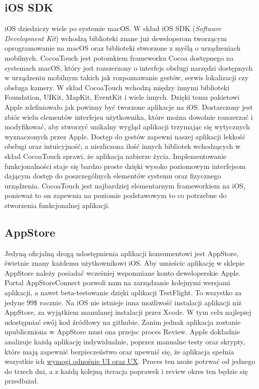 \documentclass{article}
\begin{document}
\subsection*{iOS SDK}
iOS dziedziczy wiele po systemie macOS\@. W skład iOS SDK (\textit{Software Development 
Kit}) wchodzą biblioteki znane już deweloperom tworzącym oprogramowanie na macOS
oraz biblioteki stworzone z myślą o urządzeniach mobilnych. CocoaTouch jest potomkiem 
frameworku Cocoa dostępnego na systemach macOS, który jest rozszerzony o interfejs 
obsługi narzędzi dostępnych w urządzeniu mobilnym takich jak rozpoznawanie gestów,
serwis lokalizacji czy obsługa kamery. W skład CocoaTouch wchodzą między innymi
biblioteki Foundation, UIKit, MapKit, EventKit i wiele innych. Dzięki temu pakietowi
Apple zdefiniowało jak powinny być tworzone aplikacje na iOS\@. Dostarczony jest 
zbiór wielu elementów interfejsu użytkownika, które można dowolnie rozszerzać i
modyfikować, aby stworzyć unikalny wygląd aplikacji trzymając się wytycznych
wyznaczonych przez Apple. Dostęp do gestów zapewni naszej aplikacji lekkość obsługi
oraz intuicyjność, a niezliczona ilość innych bibliotek wchodzących w skład
CocoaTouch sprawi, że aplikacja nabierze życia. Implementowanie funkcjonalności staje
się bardzo proste dzięki wysoko poziomowym interfejsom dającym dostęp do
poszczególnych elementów systemu oraz fizycznego urządzenia. CocoaTouch jest 
najbardziej elementarnym frameworkiem na iOS, ponieważ to on zapewnia na poziomie
podstawowym to co potrzebne do stworzenia funkcjonalnej aplikacji. 

\subsection*{AppStore}
Jedyną oficjalną drogą udostępnienia aplikacji konsumentowi jest AppStore, świetnie
znany każdemu użytkownikowi iOS\@. Aby umieścic aplikację w sklepie AppStore
należy posiadać wcześniej wspomniane konto deweloperskie Apple. Portal AppStoreConnect
pozwoli nam na zarządzanie kolejnymi wersjami aplikacji, a nawet beta-testowanie
dzięki aplikacji TestFlight. To wszystko za jedyne 99\$ rocznie. Na iOS nie istnieje
inna możliwość instalacji aplikacji niż AppStore, za wyjątkiem manulanej instalacji
przez Xcode. W tym celu najlepiej udostępniać swój kod źródłowy na githubie. Zanim 
jednak aplikacja zostanie upubliczniona w AppStore musi ona przejsc proces Review.
Apple dokładnie analizuje każdą aplikację indywidualnie, poprzez manualne testy oraz
skrypty, które mają zapewnić bezpieczeństwo oraz upewnić się, że aplikacja spełnia
wszystkie ich \href{https://developer.apple.com/design/human-interface-guidelines/ios/visual-design/adaptivity-and-layout/}{wymogi odnośnie UI oraz UX}. Proces ten może potrwać od jednego do trzech
dni, a z każdą kolejną iteracja poprawek i review okres ten będzie się przedłużał.
\end{document}
